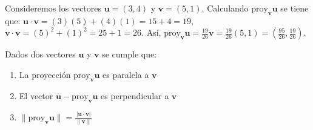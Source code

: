 \begin{example}
   Consideremos los vectores $\mathbf{u} = (3, 4)$ y $\mathbf{v} = (5, 1)$. Calculando $\text{proy}_{\mathbf{v}}\mathbf{u}$ se tiene que: $\mathbf{u} \cdot \mathbf{v}= (3)(5) + (4)(1) = 15 + 4 = 19,$ $\mathbf{v} \cdot \mathbf{v} = (5)^2 + (1)^2 = 25 + 1 = 26.$ Así, $\text{proy}_{\mathbf{v}}\mathbf{u} = \frac{19}{26} \mathbf{v} = \frac{19}{26}(5, 1) = \left(\frac{95}{26}, \frac{19}{26}\right).$

\end{example}

\begin{theorem} Dados dos vectores $\mathbf{u}$ y $\mathbf{v}$ se cumple que:
\begin{enumerate}
\item La proyección $\text{proy}_{\mathbf{v}}\mathbf{u}$ es paralela a $\mathbf{v}$
\item El vector $\mathbf{u} - \text{proy}_{\mathbf{v}}\mathbf{u}$ es perpendicular a $\mathbf{v}$
\item $\|\text{proy}_{\mathbf{v}}\mathbf{u}\| = \frac{|\mathbf{u} \cdot \mathbf{v}|}{\|\mathbf{v}\|}$
\end{enumerate}
\end{theorem}

